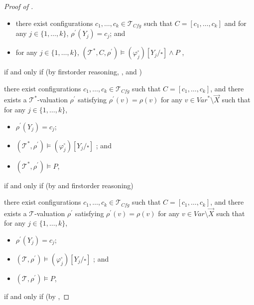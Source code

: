 \begin{proof}[Proof of ]
\begin{proofenv}
\begin{itemize}
            \item there exist configurations $c_1, \ldots, c_k \in \mathcal{T}_{\mathit{Cfg}}$ such that
                    $C = [c_1, \ldots, c_k]$ and for any $j \in \{ 1, \ldots, k \}$,
                    $\rho^{\prime}(Y_j) = c_j$; and
            \item for any $j \in \{ 1, \ldots, k \}$,
                    $(\mathcal{T}^*, C, \rho^\prime) \vDash (\varphi_j^{\square})[Y_j/\square] \land P$ ,
        \end{itemize}
    \end{proofenv}
    if and only if (by firstorder reasoning, , and )
    \begin{proofenv}
        there exist configurations $c_1, \ldots, c_k \in \mathcal{T}_{\mathit{Cfg}}$ such that $C = [c_1, \ldots, c_k]$,
        and there exists a $\mathcal{T}^*$-valuation $\rho^\prime$ satisfying $\rho^\prime(v) = \rho(v)$
        for any $v \in \mathit{Var}^* \setminus \vec{X}$ such that for any $j \in \{ 1, \ldots, k \}$,
        \begin{itemize}
            \item $\rho^{\prime}(Y_j) = c_j$;
            \item $(\mathcal{T}^*, \rho^\prime) \vDash (\varphi_j^{\square})[Y_j/\square]$ ; and
            \item $(\mathcal{T}^*, \rho^\prime) \vDash P$,
        \end{itemize}
    \end{proofenv}
    if and only if (by  and firstorder reasoning)
    \begin{proofenv}
        there exist configurations $c_1, \ldots, c_k \in \mathcal{T}_{\mathit{Cfg}}$ such that $C = [c_1, \ldots, c_k]$,
        and there exists a $\mathcal{T}$-valuation $\rho^\prime$ satisfying $\rho^\prime(v) = \rho(v)$
        for any $v \in \mathit{Var} \setminus \vec{X}$ such that for any $j \in \{ 1, \ldots, k \}$,
        \begin{itemize}
            \item $\rho^{\prime}(Y_j) = c_j$;
            \item $(\mathcal{T}, \rho^\prime) \vDash (\varphi_j^{\square})[Y_j/\square]$ ; and
            \item $(\mathcal{T}, \rho^\prime) \vDash P$,
        \end{itemize}
    \end{proofenv}
    if and only if (by ,

\end{proof}

